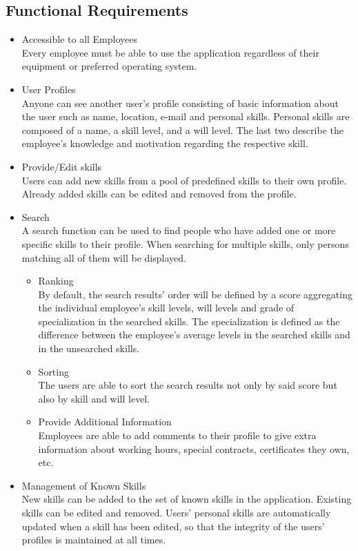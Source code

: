 \subsection{Functional Requirements}
\begin{itemize}
 	\item Accessible to all Employees\\
	Every employee must be able to use the application regardless of their equipment or preferred operating system.
	\item User Profiles \\
	Anyone can see another user’s profile consisting of basic information about the user such as name, location, e-mail and personal skills. Personal skills are composed of a name, a skill level, and a will level. The last two describe the employee's knowledge and motivation regarding the respective skill.
	\item Provide/Edit skills\\
	Users can add new skills from a pool of predefined skills to their own profile. Already added skills can be edited and removed from the profile.
	\item Search\\
	A search function can be used to find people who have added one or more specific skills to their profile. When searching for multiple skills, only persons matching all of them will be displayed.
	\begin{itemize}
		\item Ranking\\
			By default, the search results' order will be defined by a score aggregating the individual employee's skill levels, will levels and grade of specialization in the searched skills. The specialization is defined as the difference between the employee's average levels in the searched skills and in the unsearched skills.
		\item Sorting\\
			The users are able to sort the search results not only by said score
			but also by skill and will level.
	\item Provide Additional Information\\
			Employees are able to add comments to their profile to give extra information about working hours, special contracts, certificates they own, etc.
	\end{itemize}
	\item Management of Known Skills\\
	New skills can be added to the set of known skills in the application. Existing skills can be edited and removed. Users' personal skills are automatically updated when a skill has been edited, so that the integrity of the users' profiles is maintained at all times.
\end{itemize}

